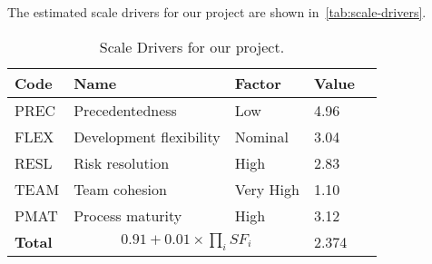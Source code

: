 The estimated scale drivers for our project are shown in~\autoref{tab:scale-drivers}.

\begin{table}[h]
    \centering
    \begin{tabular}{| l | l | l | l | l |}
        \hline
        \textbf{Code}   & \textbf{Name}             & \textbf{Factor}   & \textbf{Value}    \\
        \hline
        PREC            & Precedentedness           & Low               & 4.96                 \\
        \hline
        FLEX            & Development flexibility   & Nominal           & 3.04                 \\
        \hline
        RESL            & Risk resolution           & High              & 2.83                 \\
        \hline
        TEAM            & Team cohesion             & Very High         & 1.10                 \\
        \hline
        PMAT            & Process maturity          & High              & 3.12                 \\
        \hline
        \textbf{Total}  & \multicolumn{2}{|c|}{$0.91 + 0.01 \times \prod_{i}SF_i$}    & 2.374       \\
        \hline
    \end{tabular}
    \caption{Scale Drivers for our project.}
    \label{tab:scale-drivers}
\end{table}
